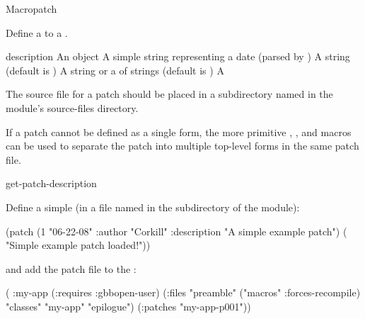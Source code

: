 \documentclass[10pt,twoside,english,pdftex]{article}
\begin{document}
\begin{functiondoc}{Macro}{patch}%
  {\code{(}
     \code{)}
    \superstar} 
%
%

\fnsyntax 

\fnpurpose Define a  to a .

\fnpackage {}

\fnmodule {}

\fnargs
\begin{args}{description}
\arg[id] An object
\arg[date] A simple string representing a date (parsed by 
  )
\arg[author] A string (default is )
\arg[description] A string or a  of strings (default is \nil)
\arg[form] A 
\end{args}

\fndescription 
%
The source file for a patch should be placed in a subdirectory named
 in the module's source-files directory.

If a patch cannot be defined as a single  form, the more
primitive ,
, and
 macros can be used to separate the
patch into multiple top-level forms in the same patch file.

\begin{alsos}{get-patch-description}
\also[undefmethod]
\end{alsos}

\fnexample 
%
Define a simple  (in a file named 
in the  subdirectory of the module):
%
%
%
%
\W\supp
\begin{example}
  (patch (1 "06-22-08" 
            :author "Corkill"
            :description "A simple example patch")
      ( "Simple example patch loaded!"))
\end{example}
%
and add the patch file to the  :
%
\W\supp\notpretop
\begin{example}
  ( :my-app
    (:requires :gbbopen-user)
    (:files "preamble"
            ("macros" :forces-recompile)
            "classes"
            "my-app"
            "epilogue")
    (:patches "my-app-p001"))
\end{example}

\end{functiondoc}
\end{document}
